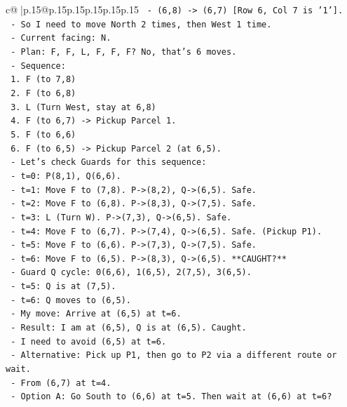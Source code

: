 \documentclass{article}
\begin{document}
{\begin{supertabular}{c@{$\;$}|p{.15\linewidth}@{}p{.15\linewidth}p{.15\linewidth}p{.15\linewidth}p{.15\linewidth}p{.15\linewidth}}
{{{\texttt{    {-} (6,8) {-}> (6,7) {[}Row 6, Col 7 is '1'{]}.} \\
\texttt{  {-} So I need to move North 2 times, then West 1 time.} \\
\texttt{  {-} Current facing: N.} \\
\texttt{  {-} Plan: F, F, L, F, F, F? No, that's 6 moves.} \\
\texttt{  {-} Sequence:} \\
\texttt{    1. F (to 7,8)} \\
\texttt{    2. F (to 6,8)} \\
\texttt{    3. L (Turn West, stay at 6,8)} \\
\texttt{    4. F (to 6,7) {-}> Pickup Parcel 1.} \\
\texttt{    5. F (to 6,6)} \\
\texttt{    6. F (to 6,5) {-}> Pickup Parcel 2 (at 6,5).} \\
\texttt{  {-} Let's check Guards for this sequence:} \\
\texttt{    {-} t=0: P(8,1), Q(6,6).} \\
\texttt{    {-} t=1: Move F to (7,8). P{-}>(8,2), Q{-}>(6,5). Safe.} \\
\texttt{    {-} t=2: Move F to (6,8). P{-}>(8,3), Q{-}>(7,5). Safe.} \\
\texttt{    {-} t=3: L (Turn W). P{-}>(7,3), Q{-}>(6,5). Safe.} \\
\texttt{    {-} t=4: Move F to (6,7). P{-}>(7,4), Q{-}>(6,5). Safe. (Pickup P1).} \\
\texttt{    {-} t=5: Move F to (6,6). P{-}>(7,3), Q{-}>(7,5). Safe.} \\
\texttt{    {-} t=6: Move F to (6,5). P{-}>(8,3), Q{-}>(6,5). **CAUGHT?**} \\
\texttt{      {-} Guard Q cycle: 0(6,6), 1(6,5), 2(7,5), 3(6,5).} \\
\texttt{      {-} t=5: Q is at (7,5).} \\
\texttt{      {-} t=6: Q moves to (6,5).} \\
\texttt{      {-} My move: Arrive at (6,5) at t=6.} \\
\texttt{      {-} Result: I am at (6,5), Q is at (6,5). Caught.} \\
\texttt{  {-} I need to avoid (6,5) at t=6.} \\
\texttt{  {-} Alternative: Pick up P1, then go to P2 via a different route or wait.} \\
\texttt{  {-} From (6,7) at t=4.} \\
\texttt{  {-} Option A: Go South to (6,6) at t=5. Then wait at (6,6) at t=6?} \\
}}}
\end{supertabular}}
\end{document}
